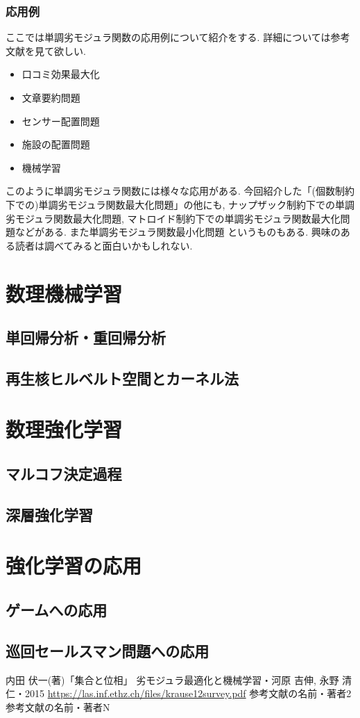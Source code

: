 \documentclass[11pt, a4paper, dvipdfmx]{jsbook}
\theoremstyle{definition}
\begin{document}
\section{応用例}
ここでは単調劣モジュラ関数の応用例について紹介をする. 詳細については参考文献を見て欲しい.
\begin{itemize}
  \item 口コミ効果最大化
  \item 文章要約問題
  \item センサー配置問題
  \item 施設の配置問題
  \item 機械学習
\end{itemize}
このように単調劣モジュラ関数には様々な応用がある. 今回紹介した「(個数制約下での)単調劣モジュラ関数最大化問題」の他にも,
ナップザック制約下での単調劣モジュラ関数最大化問題, マトロイド制約下での単調劣モジュラ関数最大化問題などがある. また単調劣モジュラ関数最小化問題
というものもある. 興味のある読者は調べてみると面白いかもしれない.
\part{数理機械学習}
\chapter{単回帰分析・重回帰分析}
\chapter{再生核ヒルベルト空間とカーネル法}
\part{数理強化学習}
\chapter{マルコフ決定過程}
\chapter{深層強化学習}
\part{強化学習の応用}
\chapter{ゲームへの応用}
\chapter{巡回セールスマン問題への応用}


\begin{thebibliography}{50}
   内田 伏一(著)「集合と位相」
   劣モジュラ最適化と機械学習・河原 吉伸,  永野 清仁・2015
   \url{https://las.inf.ethz.ch/files/krause12survey.pdf}
   参考文献の名前・著者2
   参考文献の名前・著者N
\end{thebibliography}
\end{document}
